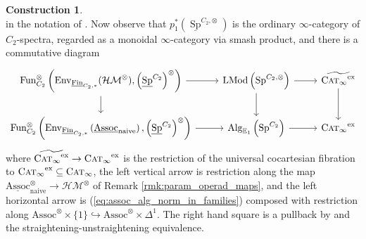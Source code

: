 \documentclass{article}
\DeclareMathOperator{\Alg}{Alg}
\DeclareMathOperator{\CAT}{C\normalfont\textsc{at}_\infty} %
\DeclareMathOperator{\Fun}{Fun} %
\DeclareMathOperator{\LMod}{LMod} %
\DeclareMathOperator{\Spectra}{Sp} %
\newcommand{\Assoc}{\mathrm{Assoc}}
\newcommand{\Fin}{\mathrm{Fin}} %
\theoremstyle{definition}
\newtheorem{construction}[equation]{Construction}
\begin{document}
\begin{construction}
\begin{equation}
    \end{equation}
    in the notation of \cite[Definition 2.1.3.1]{LurHA}. 
    Now observe that $ p_1^*\left(\underline{\Spectra}^{C_2,\otimes}\right) $ is the ordinary $ \infty $-category of $ C_2 $-spectra, regarded as a monoidal $ \infty $-category via smash product, and there is a commutative diagram
    \begin{equation}
    \begin{tikzcd}
         \Fun^\otimes_{C_2}\left(\mathrm{Env}_{\underline{\Fin}_{C_2,*}}(\mathcal{HM}^\otimes), \left(\underline{\Spectra}^{C_2}\right)^\otimes\right) \ar[r] \ar[d] & \LMod\left(\Spectra^{C_2,\otimes}\right) \ar[r] \ar[d] & \widetilde{\CAT^{\mathrm{ex}}} \ar[d] \\
         \Fun^\otimes_{C_2}\left(\mathrm{Env}_{\underline{\Fin}_{C_2,*}}\left(\underline{\mathrm{Assoc}}_{\mathrm{naive}}\right), \left(\underline{\Spectra}^{C_2}\right)^\otimes\right) \ar[r] &  \Alg_{\mathbb{E}_1}\left(\Spectra^{C_2}\right) \ar[r] & \CAT^{\mathrm{ex}} 
    \end{tikzcd}
    \end{equation}
    where $ \widetilde{\CAT^{\mathrm{ex}}} \to \CAT^{\mathrm{ex}} $ is the restriction of the universal cocartesian fibration to $ \CAT^{\mathrm{ex}} \subseteq \CAT $, the left vertical arrow is restriction along the map $ \underline{\mathrm{Assoc}}_{\mathrm{naive}}^\otimes \to \mathcal{HM}^\otimes $ of Remark \ref{rmk:param_operad_maps}, and the left horizontal arrow is (\ref{eq:assoc_alg_norm_in_families}) composed with restriction along $ \Assoc^\otimes \times \{1\} \hookrightarrow \Assoc^\otimes \times \Delta^1 $. 
    The right hand square is a pullback by \cite[Corollary 4.2.3.7(3)]{LurHA} and the straightening-unstraightening equivalence.  
\end{construction}
\end{document}

